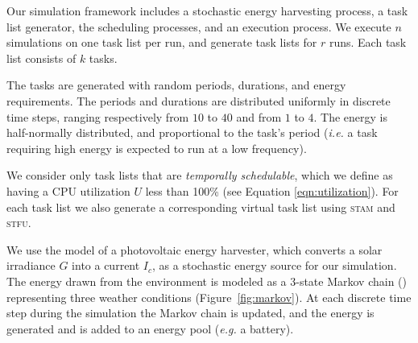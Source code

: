 Our simulation framework includes a stochastic energy harvesting process, a task list generator, the scheduling processes, and an execution process.  
We execute $n$ simulations on one task list per run, and generate task lists for $r$ runs.  Each task list consists of $k$ tasks.


The tasks are generated with random periods, durations, and energy requirements.  The periods and durations are distributed uniformly in discrete time steps, 
ranging respectively from $10$ to $40$ and from $1$ to $4$.  
The energy is half-normally distributed, and proportional to the task's period (\emph{i.e.} a task requiring high energy is expected to run at a low frequency).

We consider only task lists that are \emph{temporally schedulable}, which we define as having a 
CPU utilization $U$ less than 100\% (see Equation \ref{eqn:utilization}). 
For each task list we also generate a corresponding virtual task list using \textsc{stam} and \textsc{stfu}. 


We use the model of a photovoltaic energy harvester, which converts a solar irradiance $G$ into a current $I_c$, as a stochastic energy source for our simulation.  The energy drawn from the environment is modeled as a 3-state Markov chain (\cite{poggi2000stochastic,moser2007real}) representing three weather conditions (Figure~\ref{fig:markov}).  At each discrete time step during the simulation the Markov chain is updated, and the energy is generated and is added to an energy pool (\emph{e.g.} a battery).

